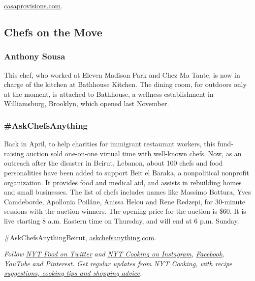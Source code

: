 \href{https://casaprovisions.com/}{casaprovisions.com}.

\hypertarget{chefs-on-the-move}{%
\subsection{Chefs on the Move}\label{chefs-on-the-move}}

\hypertarget{anthony-sousa-}{%
\subsubsection{Anthony Sousa }\label{anthony-sousa-}}

This chef, who worked at Eleven Madison Park and Chez Ma Tante, is now
in charge of the kitchen at Bathhouse Kitchen. The dining room, for
outdoors only at the moment, is attached to Bathhouse, a wellness
establishment in Williamsburg, Brooklyn, which opened last November.

\hypertarget{askchefsanything-}{%
\subsubsection{\#AskChefsAnything }\label{askchefsanything-}}

Back in April, to help charities for immigrant restaurant workers, this
fund-raising auction sold one-on-one virtual time with well-known chefs.
Now, as an outreach after the disaster in Beirut, Lebanon, about 100
chefs and food personalities have been added to support Beit el Baraka,
a nonpolitical nonprofit organization. It provides food and medical aid,
and assists in rebuilding homes and small businesses. The list of chefs
includes names like Massimo Bottura, Yves Camdeborde, Apollonia Poilâne,
Anissa Helou and Rene Redzepi, for 30-minute sessions with the auction
winners. The opening price for the auction is \$60. It is live starting
8 a.m. Eastern time on Thursday, and will end at 6 p.m. Sunday.

\#AskChefsAnythingBeirut,
\href{http://askchefsanything.com/}{askchefsanything.com}.

\emph{Follow} \href{https://twitter.com/nytfood}{\emph{NYT Food on
Twitter}} \emph{and}
\href{https://www.instagram.com/nytcooking/}{\emph{NYT Cooking on
Instagram}}\emph{,}
\href{https://www.facebookcorewwwi.onion/nytcooking/}{\emph{Facebook}}\emph{,}
\href{https://www.youtube.com/nytcooking}{\emph{YouTube}} \emph{and}
\href{https://www.pinterest.com/nytcooking/}{\emph{Pinterest}}\emph{.}
\href{https://www.nytimes3xbfgragh.onion/newsletters/cooking}{\emph{Get
regular updates from NYT Cooking, with recipe suggestions, cooking tips
and shopping advice}}\emph{.}

